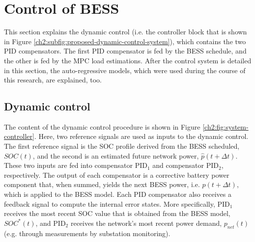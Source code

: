 \section{Control of BESS}
\label{ch2:sec:control-of-bess}



This section explains the dynamic control (i.e. the controller block that is shown in Figure \ref{ch2:subfig:proposed-dynamic-control-system}), which contains the two PID compensators.
The first PID compensator is fed by the BESS schedule, and the other is fed by the MPC load estimations.
After the control system is detailed in this section, the auto-regressive models, which were used during the course of this research, are explained, too.

\subsection{Dynamic control}

The content of the dynamic control procedure is shown in Figure \ref{ch2:fig:system-controller}.
Here, two reference signals are used as inputs to the dynamic control.
The first reference signal is the SOC profile derived from the BESS scheduled, $SOC(t)$, and the second is an estimated future network power, $\hat{p}(t+\Delta t)$.
These two inputs are fed into compensator PID$_1$ and compensator PID$_2$, respectively.
The output of each compensator is a corrective battery power component that, when summed, yields the next BESS power, i.e. $p(t+\Delta t)$, which is applied to the BESS model.
Each PID compensator also receives a feedback signal to compute the internal error states.
More specifically, PID$_1$ receives the most recent SOC value that is obtained from the BESS model, $SOC^*(t)$, and PID$_2$ receives the network's most recent power demand, $p_{net}(t)$ (e.g. through measurements by substation monitoring).


